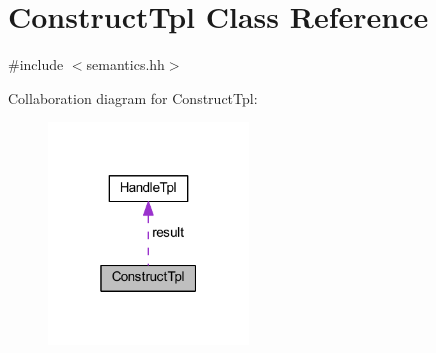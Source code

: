 \hypertarget{class_construct_tpl}{}\section{Construct\+Tpl Class Reference}
\label{class_construct_tpl}


{\ttfamily \#include $<$semantics.\+hh$>$}



Collaboration diagram for Construct\+Tpl\+:
\nopagebreak
\begin{figure}[H]
\begin{center}
\leavevmode
\includegraphics[width=151pt]{class_construct_tpl__coll__graph}
\end{center}
\end{figure}
